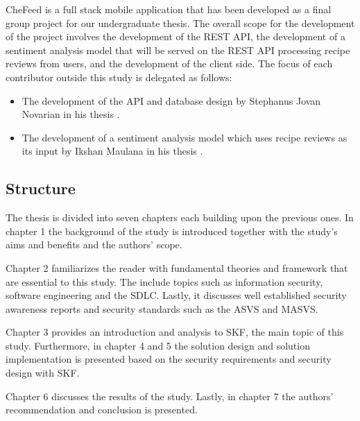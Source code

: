 CheFeed is a full stack mobile application that has been developed as a final group project for our undergraduate thesis. The overall scope for the development of the project involves the development of the REST API, the development of a sentiment analysis model that will be served on the REST API processing recipe reviews from users, and the development of the client side. The focus of each contributor outside this study is delegated as follows:

\begin{itemize}
    \item The development of the API and database design by Stephanus Jovan Novarian in his thesis .
    \item The development of a sentiment analysis model which uses recipe reviews as its input by Ikshan Maulana in his thesis .
\end{itemize}

\subsection{Structure}
The thesis is divided into seven chapters each building upon the previous ones. In chapter 1 the background of the study is introduced together with the study's aims and benefits and the authors' scope.

Chapter 2 familiarizes the reader with fundamental theories and framework that are essential to this study. The include topics such as information security, software engineering and the SDLC. Lastly, it discusses well established security awareness reports and security standards such as the ASVS and MASVS.

Chapter 3 provides an introduction and analysis to SKF, the main topic of this study. Furthermore, in chapter 4 and 5 the solution design and solution implementation is presented based on the security requirements and security design with SKF. 

Chapter 6 discusses the results of the study. Lastly, in chapter 7 the authors' recommendation and conclusion is presented.
